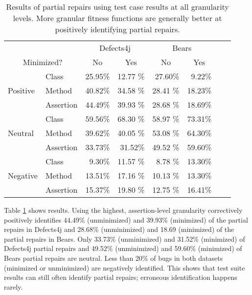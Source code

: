 \documentclass[sigconf, timestamp-false, anonymous=true]{acmart}
\begin{document}
\begin{table}
{\begin{center}
\begin{tabular}{ll|rr|rrrr}
\toprule
\multicolumn{2}{c}{}&\multicolumn{2}{c}{Defects4j} & \multicolumn{2}{c}{Bears} \\
\multicolumn{2}{c}{Minimized?} & \multicolumn{1}{c}{No} & \multicolumn{1}{c}{Yes} & \multicolumn{1}{c}{No} & \multicolumn{1}{c}{Yes}  \\
\midrule
\multirow{3}{*}{Positive} & Class & 25.95\% & 12.77 \% & 27.60\% & 9.22\%  \\
 & Method & 40.82\% & 34.58 \% & 28.41 \% & 18.23\%  \\
 & Assertion & 44.49\% & 39.93 \% & 28.68 \% & 18.69\%  \\ 
\midrule
\multirow{3}{*}{Neutral} & Class & 59.56\% & 68.30 \% & 58.97 \% & 73.31\% \\
 & Method & 39.62\% & 40.05 \% & 53.08 \% & 64.30\%  \\
 & Assertion & 33.73\% & 31.52\% & 49.52 \% &  59.60\%  \\ 
\midrule
\multirow{3}{*}{Negative} & Class & 9.30\% & 11.57 \% & 8.78 \% & 13.30\%  \\
 & Method & 13.51\% & 17.16 \% & 10.13 \% & 13.30\%  \\
 & Assertion & 15.37\% & 19.80 \% & 12.75 \% &  16.41\%  \\ 
\bottomrule
\end{tabular}
\end{center}}
\caption{Results of partial repairs using test case results
at all granularity levels.
More granular fitness functions are generally better at positively identifying partial repairs.}
\label{yiweitable}
\end{table}

Table \ref{yiweitable} shows results.
%
Using the highest, assertion-level granularity correctively positively identifies 44.49\% (unminimized) and 39.93\% (minimized) of the partial repairs in Defects4j
and 28.68\% (unminimized) and 18.69 (minimized) of the partial repairs in Bears.
Only 33.73\% (unminimized) and 31.52\% (minimized) of Defects4j partial repairs and 
49.52\% (unminimized) and 59.60\% (minimized)
of Bears partial repairs are neutral. Less than 20\% of bugs in both datasets 
(minimized or unminimized) are negatively identified. This shows that
test suite results can still often identify
partial repairs; erroneous identification happens rarely. 
 
\end{document}

